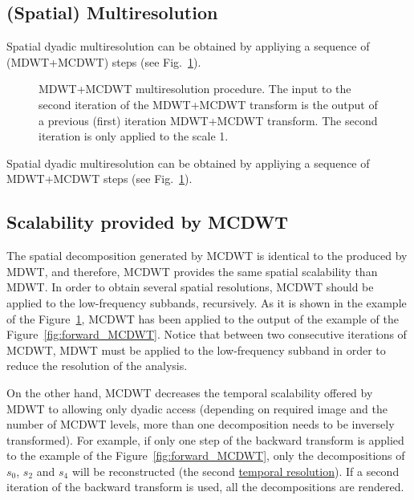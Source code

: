 


\subsection{(Spatial) Multiresolution}
Spatial dyadic multiresolution can be obtained by appliying a sequence
of (MDWT+MCDWT) steps (see Fig.~\ref{fig:multiresolution}).

\begin{figure}
  \centering %
  \caption{MDWT+MCDWT multiresolution procedure. The input to the second
    iteration of the MDWT+MCDWT transform is the output of a previous
    (first) iteration MDWT+MCDWT transform. The second iteration is only
    applied to the scale 1.} %
  \label{fig:multiresolution}
\end{figure}

Spatial dyadic multiresolution can be obtained by appliying a sequence
of MDWT+MCDWT steps (see Fig.~\ref{fig:multiresolution}).

\subsection{Scalability provided by MCDWT}
The spatial decomposition generated by MCDWT is identical to the
produced by MDWT, and therefore, MCDWT provides the same spatial
scalability than MDWT. In order to obtain several spatial resolutions,
MCDWT should be applied to the low-frequency subbands, recursively. As
it is shown in the example of the Figure~\ref{fig:multiresolution},
MCDWT has been applied to the output of the example of the
Figure~\ref{fig:forward_MCDWT}. Notice that between two consecutive
iterations of MCDWT, MDWT must be applied to the low-frequency subband
in order to reduce the resolution of the analysis.

On the other hand, MCDWT decreases the temporal scalability offered by
MDWT to allowing only dyadic access (depending on required image and
the number of MCDWT levels, more than one decomposition needs to be
inversely transformed). For example, if only one step of the backward
transform is applied to the example of the
Figure~\ref{fig:forward_MCDWT}, only the decompositions of $s_0$,
$s_2$ and $s_4$ will be reconstructed (the second
\href{https://en.wikipedia.org/wiki/Temporal_resolution}{temporal
  resolution}). If a second iteration of the backward transform is
used, all the decompositions are rendered.

